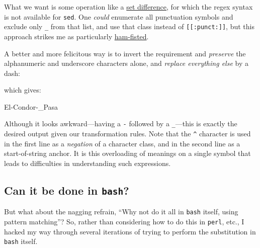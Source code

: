 \documentclass[
  a4paper,
]{article}
\newenvironment{Shaded}{\begin{snugshade}}{\end{snugshade}}
\newcommand{\AttributeTok}[1]{\textcolor[rgb]{0.80,0.80,0.80}{#1}}
\newcommand{\DataTypeTok}[1]{\textcolor[rgb]{0.87,0.87,0.75}{#1}}
\newcommand{\ExtensionTok}[1]{\textcolor[rgb]{0.80,0.80,0.80}{#1}}
\newcommand{\FunctionTok}[1]{\textcolor[rgb]{0.94,0.94,0.56}{#1}}
\newcommand{\KeywordTok}[1]{\textcolor[rgb]{0.94,0.87,0.69}{#1}}
\newcommand{\OperatorTok}[1]{\textcolor[rgb]{0.94,0.94,0.82}{#1}}
\newcommand{\StringTok}[1]{\textcolor[rgb]{0.80,0.58,0.58}{#1}}
\begin{document}
What we want is some operation like a
\href{https://mathworld.wolfram.com/SetDifference.html}{set difference},
for which the regex syntax is not available for \texttt{sed}. One
\emph{could} enumerate all punctuation symbols and exclude only
\texttt{\_} from that list, and use that class instead of
\texttt{{[}{[}:punct:{]}{]}}, but this approach strikes me as
particularly
\href{https://idioms.thefreedictionary.com/Ham+Fisted}{ham-fisted}.

A better and more felicitous way is to invert the requirement and
\emph{preserve} the alphanumeric and underscore characters alone, and
\emph{replace everything else} by a dash:

\begin{Shaded}
\end{Shaded}

which gives:

\begin{Shaded}
\begin{Highlighting}[]
\ExtensionTok{El{-}Condor{-}\_Pasa}
\end{Highlighting}
\end{Shaded}

Although it looks awkward---having a \texttt{-} followed by a
\texttt{\_}---this is exactly the desired output given our
transformation rules. Note that the \texttt{\^{}} character is used in
the first line as a \emph{negation} of a character class, and in the
second line as a start-of-string anchor. It is this overloading of
meanings on a single symbol that leads to difficulties in understanding
such expressions.

\hypertarget{can-it-be-done-in-bash}{%
\subsection{\texorpdfstring{Can it be done in
\texttt{bash}?}{Can it be done in bash?}}\label{can-it-be-done-in-bash}}

But what about the nagging refrain, ``Why not do it all in \texttt{bash}
itself, using pattern matching''? So, rather than considering how to do
this in \texttt{perl}, etc., I hacked my way through several iterations
of trying to perform the substitution in \texttt{bash} itself.
\end{document}
